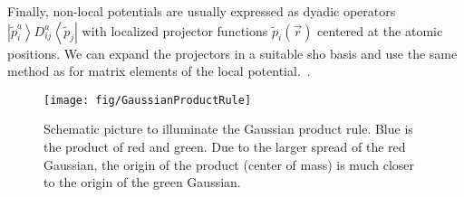 \documentclass[oribibl]{llncs}
\newcommand{\ket}[1]{\left| #1 \right\rangle}
\newcommand{\bra}[1]{\left\langle #1 \right|}
\begin{document}
Finally, non-local potentials are usually expressed as dyadic operators
$\ket{\tilde p^a_i} D^a_{ij} \bra{\tilde p_j}$ with localized projector functions $\tilde p_i(\vec r)$
centered at the atomic positions.
We can expand the projectors in a suitable \ac{sho} basis and use the same method
as for matrix elements of the local potential.~\cite{BaumeisterTsukamotoPASC19}.

%
\begin{figure}
  \begin{minipage}[c]{.990\textwidth}
	\texttt{[image: fig/GaussianProductRule]} %
  \end{minipage}\hfill
  \begin{minipage}[c]{.009\textwidth}
  \end{minipage}
  \label{fig:GaussianProductRule}
  \caption{
Schematic picture to illuminate the Gaussian product rule. Blue is the product of red and green.
Due to the larger spread of the red Gaussian, the origin of the product (center of mass) is much closer to
the origin of the green Gaussian.
  }
\end{figure}
%
%
\end{document}
